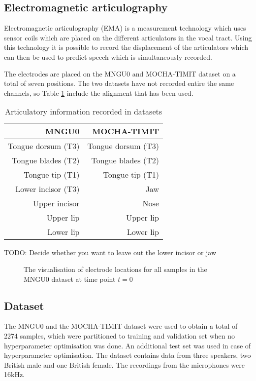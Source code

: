 \documentclass[a4paper]{article}
\begin{document}
\subsection{Electromagnetic articulography}

Electromagnetic articulography (EMA) is a measurement technology which uses
sensor coils which are placed on the different articulators in the vocal tract.
Using this technology it is possible to record the displacement of the articulators
which can then be used to predict speech which is simultaneously recorded.

The electrodes are placed on the MNGU0 \cite{Richmond2011} and MOCHA-TIMIT dataset on a total
of seven positions. The two datasets have not recorded entire the
same channels, so Table \ref{tab:electrodes} include the alignment
that has been used.
\begin{table}[th]
  \label{tab:electrodes}
  \caption{Articulatory information recorded in datasets}
  \centering
  \begin{tabular}{ r r }
    \toprule
    \textbf{MNGU0} & \textbf{MOCHA-TIMIT} \\
    \midrule
    Tongue dorsum (T3) & Tongue dorsum (T3) \\
    Tongue blades (T2) & Tongue blades (T2) \\
    Tongue tip (T1) & Tongue tip (T1) \\
    Lower incisor (T3) & Jaw \\
    Upper incisor & Nose \\
    Upper lip & Upper lip \\
    Lower lip & Lower lip \\
    \bottomrule
    \end{tabular}
\end{table}

TODO: Decide whether you want to leave out the lower incisor or jaw

\begin{figure}[t]
  \begin{center}
    \scalebox{0.50}{}
  \caption{The visualisation of electrode locations for all samples in
    the MNGU0 dataset at time point \( t = 0 \)}
\end{center}
\end{figure}
\subsection{Dataset}

The MNGU0 and the MOCHA-TIMIT dataset were used to obtain a total of
2274 samples, which were partitioned to training and validation set when
no hyperparameter optimisation was done. An additional test set was used
in case of hyperparameter optimisation. The dataset contains data from
three speakers, two British male and one British female. The recordings
from the microphones were 16kHz.
\end{document}
